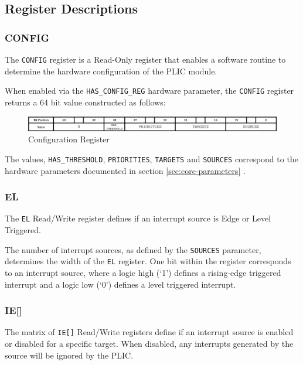 \subsection{Register Descriptions}

\subsubsection{CONFIG}

The \texttt{CONFIG} register is a Read-Only register that enables a
software routine to determine the hardware configuration of the PLIC
module.

When enabled via the \texttt{HAS\_CONFIG\_REG} hardware parameter, the
\texttt{CONFIG} register returns a 64 bit value constructed as follows:

\begin{figure}[h] 
	\includegraphics{img/config} 
	\caption[Configuration Register]{Configuration Register}
	\label{fig:configreg}
\end{figure}



The values, \texttt{HAS\_THRESHOLD}, \texttt{PRIORITIES},
\texttt{TARGETS} and \texttt{SOURCES} correspond to the hardware
parameters documented in section \ref{sec:core-parameters} .

\subsubsection{EL}

The \texttt{EL} Read/Write register defines if an interrupt source is
Edge or Level Triggered.

The number of interrupt sources, as defined by the
\texttt{SOURCES} parameter, determines the width of the \texttt{EL} register. 
One bit within the register corresponds to an interrupt source, where a 
logic high (`1') defines a rising-edge triggered interrupt and a logic 
low (`0') defines a level triggered interrupt.

\subsubsection{IE[]}

The matrix of \texttt{IE[]} Read/Write registers define if an
interrupt source is enabled or disabled for a specific target. When
disabled, any interrupts generated by the source will be ignored by the
PLIC.

